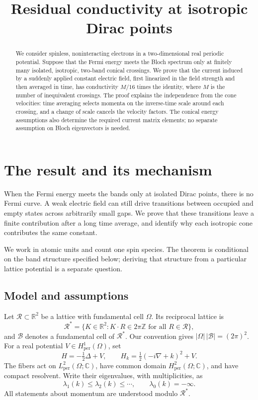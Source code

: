 \documentclass[11pt,a4paper]{article}
\title{Residual conductivity at isotropic Dirac points}
\author{}
\date{}
\newcommand{\R}{\mathbb R}
\newcommand{\C}{\mathbb C}
\newcommand{\per}{\mathrm{per}}
\theoremstyle{remark}
\numberwithin{equation}{section}
\begin{document}
\maketitle
\vspace{-2.5em}

\begin{abstract}
We consider spinless, noninteracting electrons in a two-dimensional real
periodic potential. Suppose that the Fermi energy meets the Bloch spectrum
only at finitely many isolated, isotropic, two-band conical crossings.
We prove that the current induced by a suddenly applied constant electric
field, first linearized in the field strength and then averaged in time,
has conductivity $M/16$ times the identity, where $M$ is the number of
inequivalent crossings. The proof explains the independence from the cone
velocities: time averaging selects momenta on the inverse-time scale
around each crossing, and a change of scale cancels the velocity factors. The conical
energy assumptions also determine the required current matrix elements;
no separate assumption on Bloch eigenvectors is needed.
\end{abstract}

\section{The result and its mechanism}\label{sec:result}

When the Fermi energy meets the bands only at isolated Dirac points,
there is no Fermi curve. A weak electric field can still drive transitions
between occupied and empty states across arbitrarily small gaps.
We prove that these transitions leave a finite contribution after a long
time average, and identify why each isotropic cone contributes the same
constant.

We work in atomic units and count one spin species. The theorem is
conditional on the band structure specified below; deriving that
structure from a particular lattice potential is a separate question.

\subsection{Model and assumptions}

Let $\mathcal R\subset\R^2$ be a lattice with fundamental cell $\Omega$.
Its reciprocal lattice is
\[
 \mathcal R^*=
 \{K\in\R^2:K\cdot R\in2\pi\mathbb Z\text{ for all }R\in\mathcal R\},
\]
and $\mathcal B$ denotes a fundamental cell of $\mathcal R^*$.
Our convention gives $|\Omega|\,|\mathcal B|=(2\pi)^2$.
For a real potential $V\in H^1_{\per}(\Omega)$, set
\begin{equation}\label{eq:H}
 H=-\tfrac12\Delta+V,
 \qquad
 H_k=\tfrac12(-i\nabla+k)^2+V.
\end{equation}
The fibers act on $L^2_{\per}(\Omega;\C)$, have common domain
$H^2_{\per}(\Omega;\C)$, and have compact resolvent. Write their eigenvalues,
with multiplicities, as
\[
 \lambda_1(k)\le\lambda_2(k)\le\cdots,
 \qquad \lambda_0(k)=-\infty.
\]
All statements about momentum are understood modulo $\mathcal R^*$.
\end{document}

